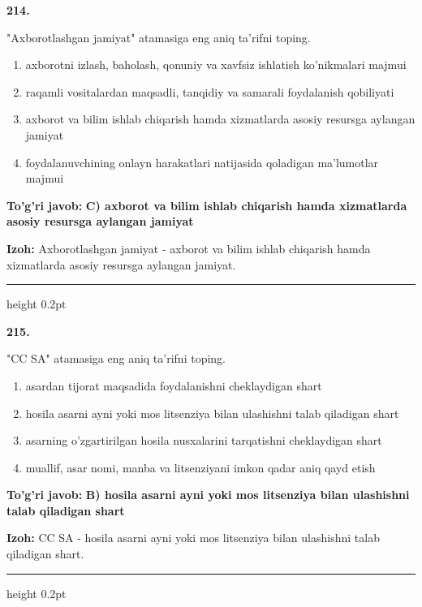\documentclass[10pt,a4paper,oneside]{article}
\begin{document}
\noindent\textbf{\color{ink}214.}
\par
"Axborotlashgan jamiyat" atamasiga eng aniq ta'rifni toping.
\begin{enumerate}[label=\Alph*),leftmargin=9mm]
\item axborotni izlash, baholash, qonuniy va xavfsiz ishlatish ko'nikmalari majmui
\item raqamli vositalardan maqsadli, tanqidiy va samarali foydalanish qobiliyati
\item axborot va bilim ishlab chiqarish hamda xizmatlarda asosiy resursga aylangan jamiyat
\item foydalanuvchining onlayn harakatlari natijasida qoladigan ma'lumotlar majmui
\end{enumerate}
\begin{tcolorbox}[enhanced,breakable,colback=teal!4,colframe=teal!50!black,boxrule=0.5pt,arc=1.1mm,left=3mm,right=3mm,top=1.7mm,bottom=1.7mm,before skip=2mm,after skip=2mm]
\textbf{\color{teal}To'g'ri javob:} \textbf{C) axborot va bilim ishlab chiqarish hamda xizmatlarda asosiy resursga aylangan jamiyat}
\par\smallskip
\textbf{Izoh:} Axborotlashgan jamiyat - axborot va bilim ishlab chiqarish hamda xizmatlarda asosiy resursga aylangan jamiyat.
\end{tcolorbox}
\vspace{2mm}\hrule height 0.2pt \vspace{3mm}

\noindent\textbf{\color{ink}215.}
\par
"CC SA" atamasiga eng aniq ta'rifni toping.
\begin{enumerate}[label=\Alph*),leftmargin=9mm]
\item asardan tijorat maqsadida foydalanishni cheklaydigan shart
\item hosila asarni ayni yoki mos litsenziya bilan ulashishni talab qiladigan shart
\item asarning o'zgartirilgan hosila nusxalarini tarqatishni cheklaydigan shart
\item muallif, asar nomi, manba va litsenziyani imkon qadar aniq qayd etish
\end{enumerate}
\begin{tcolorbox}[enhanced,breakable,colback=teal!4,colframe=teal!50!black,boxrule=0.5pt,arc=1.1mm,left=3mm,right=3mm,top=1.7mm,bottom=1.7mm,before skip=2mm,after skip=2mm]
\textbf{\color{teal}To'g'ri javob:} \textbf{B) hosila asarni ayni yoki mos litsenziya bilan ulashishni talab qiladigan shart}
\par\smallskip
\textbf{Izoh:} CC SA - hosila asarni ayni yoki mos litsenziya bilan ulashishni talab qiladigan shart.
\end{tcolorbox}
\vspace{2mm}\hrule height 0.2pt \vspace{3mm}
\end{document}
